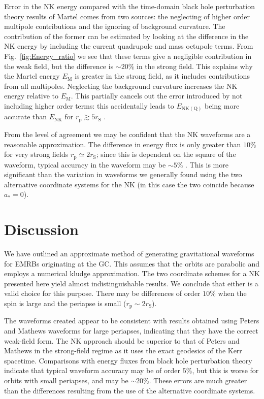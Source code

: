 \documentclass[useAMS,usedcolumn,usegraphicx,usenatbib]{mn2e}
\newcommand{\figref}[1]{Fig.~\ref{fig:#1}}
\newcommand{\sub}[1]{\ensuremath{_\mathrm{#1}}}
\begin{document}
Error in the NK energy compared with the time-domain black hole perturbation theory results of Martel comes from two sources: the neglecting of higher order multipole contributions and the ignoring of background curvature. The contribution of the former can be estimated by looking at the difference in the NK energy by including the current quadrupole and mass octupole terms. From \figref{Energy_ratio} we see that these terms give a negligible contribution in the weak field, but the difference is $\sim20\%$ in the strong field. This explains why the Martel energy $E\sub{M}$ is greater in the strong field, as it includes contributions from all multipoles. Neglecting the background curvature increases the NK energy relative to $E\sub{M}$. This partially cancels out the error introduced by not including higher order terms: this accidentally leads to $E\sub{NK(Q)}$ being more accurate than $E\sub{NK}$ for $r\sub{p} \gtrsim 5 r\sub{S}$ \citep{Tanaka1993}.

From the level of agreement we may be confident that the NK waveforms are a reasonable approximation. The difference in energy flux is only greater than $10\%$ for very strong fields $r\sub{p} \simeq 2 r\sub{S}$; since this is dependent on the square of the waveform, typical accuracy in the waveform may be $\sim 5\%$ \citep{Gair2005,Tanaka1993}. This is more significant than the variation in waveforms we generally found using the two alternative coordinate systems for the NK (in this case the two coincide because $a_\ast = 0$).

\section{Discussion}\label{sec:End}

We have outlined an approximate method of generating gravitational waveforms for EMRBs originating at the GC. This assumes that the orbits are parabolic and employs a numerical kludge approximation. The two coordinate schemes for a NK presented here yield almost indistinguishable results. We conclude that either is a valid choice for this purpose. There may be differences of order $10\%$ when the spin is large and the periapse is small ($r\sub{p} \sim 2r\sub{S}$).

The waveforms created appear to be consistent with results obtained using Peters and Mathews waveforms for large periapses, indicating that they have the correct weak-field form. The NK approach should be superior to that of Peters and Mathews in the strong-field regime as it uses the exact geodesics of the Kerr spacetime. Comparisons with energy fluxes from black hole perturbation theory indicate that typical waveform accuracy may be of order $5\%$, but this is worse for orbits with small periapses, and may be $\sim 20\%$. These errors are much greater than the differences resulting from the use of the  alternative coordinate systems.
\end{document}
